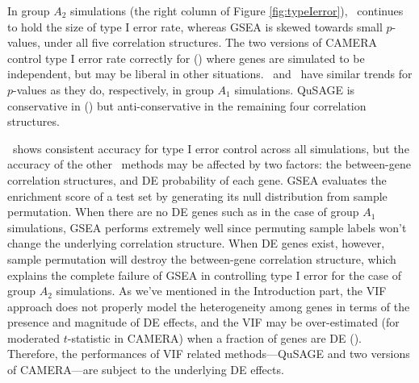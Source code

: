 	In group $A_2$ simulations (the right column of Figure \ref{fig:typeIerror}),  
	\OurMethod~continues to hold the size of type I error rate, whereas GSEA is skewed towards 
	small $p$-values, under all five correlation structures. The two versions of CAMERA control 
	type I error rate correctly for	(\aaCase) where genes are simulated to be independent, but may 
	be liberal in other situations.
	\gent~and \genr~have similar trends for $p$-values as they do, respectively, in group $A_1$
	simulations. QuSAGE is conservative in (\cCase) but anti-conservative in the remaining four
	correlation structures.
	

	
	\OurMethod~shows consistent accuracy for type I error control across all simulations, but the
	accuracy of the other \HowmanyTest~methods may be affected by two factors: the between-gene
	correlation structures, and DE probability of each gene. %
	GSEA evaluates the enrichment score
	of a test set by generating its null distribution from sample permutation. When there are no DE 
	genes such as in the case of group $A_1$ simulations, GSEA performs extremely well since 
	permuting sample labels won't change the underlying correlation structure. When DE genes exist, 
	however, sample	permutation will destroy the between-gene correlation structure, which 
	explains the complete failure of GSEA in controlling type I error for the case of group $A_2$ 
	simulations. As we've mentioned in the Introduction part, the VIF approach does not properly 
	model the heterogeneity among genes in terms of the presence and magnitude of DE effects, and 
	the VIF may be over-estimated (for moderated $t$-statistic in CAMERA)  when a fraction of genes 
	are DE (\thepapertobefinished). Therefore, the 
	performances of VIF related methods---QuSAGE and two versions of
	CAMERA---are subject to the underlying DE effects. 
	
